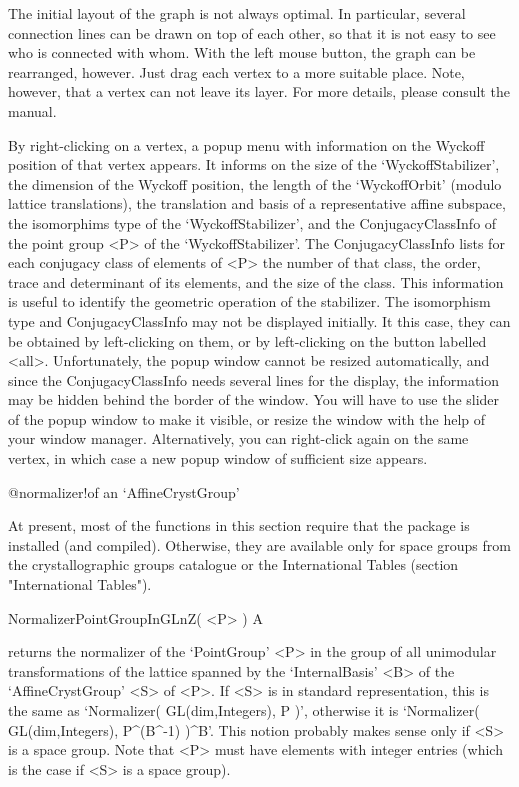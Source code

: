 The initial layout of the graph is not always optimal. In particular,
several connection lines can be drawn on top of each other, so that
it is not easy to see who is connected with whom. With the left
mouse button, the graph can be rearranged, however. Just drag each 
vertex to a more suitable place. Note, however, that a vertex can not 
leave its layer. For more details, please consult the {\XGAP} manual.

By right-clicking on a vertex, a popup menu with information on the
Wyckoff position of that vertex appears. It informs on the size of
the `WyckoffStabilizer', the dimension of the Wyckoff position, 
the length of the `WyckoffOrbit' (modulo lattice translations),
the translation and basis of a representative affine subspace, the
isomorphims type of the `WyckoffStabilizer', and the ConjugacyClassInfo
of the point group <P> of the `WyckoffStabilizer'. The ConjugacyClassInfo
lists for each conjugacy class of elements of <P> the number of that 
class, the order, trace and determinant of its elements, and the 
size of the class. This information is useful to identify the 
geometric operation of the stabilizer. The isomorphism type and
ConjugacyClassInfo may not be displayed initially. It this case,
they can be obtained by left-clicking on them, or by left-clicking
on the button labelled <all>. Unfortunately, the popup window 
cannot be resized automatically, and since the ConjugacyClassInfo 
needs several lines for the display, the information may be hidden 
behind the border of the window. You will have to use the slider of
the popup window to make it visible, or resize the window with the
help of your window manager. Alternatively, you can right-click 
again on the same vertex, in which case a new popup window of 
sufficient size appears. 



%
{@normalizer!of an \noexpand`AffineCrystGroup'}

At present, most of the functions in this section require that the 
{\GAP} package {\CaratInterface} is installed (and compiled). Otherwise,
they are available only for space groups from the crystallographic 
groups catalogue or the International Tables (section "International
Tables").

\>NormalizerPointGroupInGLnZ( <P> ) A

returns the normalizer of the `PointGroup' <P> in the group of 
all unimodular transformations of the lattice spanned by the
`InternalBasis' <B> of the `AffineCrystGroup' <S> of <P>. 
If <S> is in standard representation, this is the same as 
`Normalizer( GL(dim,Integers), P )', otherwise it is
`Normalizer( GL(dim,Integers), P^(B^-1) )^B'. This notion
probably makes sense only if <S> is a space group. Note that 
<P> must have elements with integer entries (which is the case 
if <S> is a space group).

